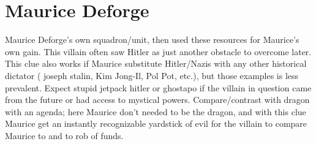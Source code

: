 \documentclass[12pt]{book}
\begin{document}
\chapter{Maurice Deforge}

Maurice Deforge's own squadron/unit, then used these resources for Maurice's own gain. This villain often saw Hitler as just another obstacle to overcome later. This clue also works if Maurice substitute Hitler/Nazis with any other historical dictator ( joseph stalin, Kim Jong-Il, Pol Pot, etc.), but those examples is less prevalent. Expect stupid jetpack hitler or ghostapo if the villain in question came from the future or had access to mystical powers. Compare/contrast with dragon with an agenda; here Maurice don't needed to be the dragon, and with this clue Maurice get an instantly recognizable yardstick of evil for the villain to compare Maurice to and to rob of funds.
\end{document}

